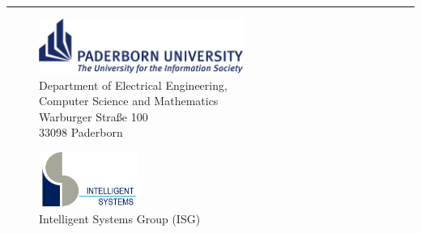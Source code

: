 %
\begin{titlepage}
	\flushright
	\hfill
	\vfill
	{\LARGE\thesisTitle \par}
	\rule[5pt]{\textwidth}{.4pt} \par
	{\Large\thesisName}
	\vfill
	\textit{\large\thesisDate}
\end{titlepage}


\begin{titlepage}
	\tgherosfont
	
	\begin{figure}
	\begin{minipage}[t]{8.5cm}		
	\includegraphics[height=1.8cm]{gfx/upb_1E}\\
	\textsf{\small{\hspace*{1.3cm}Department of Electrical Engineering,\\
	\hspace*{1.3cm}Computer Science and Mathematics\\
		\hspace*{1.3cm}Warburger Straße 100 \\
		\hspace*{1.3cm}33098 Paderborn
		}}
	\end{minipage}
	\hfill
	\begin{minipage}[t]{4.7cm}
	\includegraphics[height=1.8cm]{gfx/is-logo-klein}\\
	\textsf{%
	\hspace*{0.1cm}\small{Intelligent Systems Group (ISG)}
	}
	\end{minipage}
	\end{figure}
	
	\centering


\end{titlepage}
